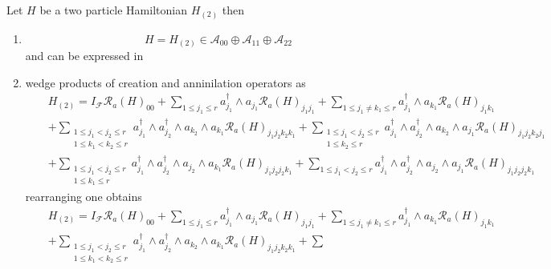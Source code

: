 \documentclass[aps,preprint]{revtex4}
\begin{document}
Let $H$ be a two particle Hamiltonian $H_{\left( 2\right) }$ then

\begin{enumerate}
\item 
\begin{equation}
H=H_{\left( 2\right) }\in \mathcal{A}_{00}\oplus \mathcal{A}_{11}\oplus 
\mathcal{A}_{22}
\end{equation}%
and can be expressed in

\item wedge products of creation and anninilation operators as 
\begin{eqnarray}
&&H_{\left( 2\right) }=I_{\mathcal{F}}\mathcal{R}_{a}\left( H\right)
_{00}+\sum_{1\leq j_{1}\leq r}a_{j_{1}}^{\dagger }\wedge a_{j_{1}}\mathcal{R}%
_{a}\left( H\right) _{j_{1}j_{1}}+\sum_{1\leq j_{1}\neq k_{1}\leq
r}a_{j_{1}}^{\dagger }\wedge a_{k_{1}}\mathcal{R}_{a}\left( H\right)
_{j_{1}k_{1}} \\
&&+\sum_{\substack{ 1\leq j_{1}<j_{2}\leq r \\ 1\leq k_{1}<k_{2}\leq r}}%
a_{j_{1}}^{\dagger }\wedge a_{j_{2}}^{\dagger }\wedge a_{k_{2}}\wedge
a_{k_{1}}\mathcal{R}_{a}\left( H\right) _{j_{1}j_{2}k_{2}k_{1}}+\sum
_{\substack{ 1\leq j_{1}<j_{2}\leq r \\ 1\leq k_{2}\leq r}}%
a_{j_{1}}^{\dagger }\wedge a_{j_{2}}^{\dagger }\wedge a_{k_{2}}\wedge
a_{j_{1}}\mathcal{R}_{a}\left( H\right) _{j_{1}j_{2}k_{2}j_{1}} \\
&&+\sum_{\substack{ 1\leq j_{1}<j_{2}\leq r \\ 1\leq k_{1}\leq r}}%
a_{j_{1}}^{\dagger }\wedge a_{j_{2}}^{\dagger }\wedge a_{j_{2}}\wedge
a_{k_{1}}\mathcal{R}_{a}\left( H\right) _{j_{1}j_{2}j_{2}k_{1}}+\sum_{1\leq
j_{1}<j_{2}\leq r}a_{j_{1}}^{\dagger }\wedge a_{j_{2}}^{\dagger }\wedge
a_{j_{2}}\wedge a_{j_{1}}\mathcal{R}_{a}\left( H\right)
_{j_{1}j_{2}j_{2}k_{1}}
\end{eqnarray}%
rearranging one obtains 
\begin{eqnarray}
&&H_{\left( 2\right) }=I_{\mathcal{F}}\mathcal{R}_{a}\left( H\right)
_{00}+\sum_{1\leq j_{1}\leq r}a_{j_{1}}^{\dagger }\wedge a_{j_{1}}\mathcal{R}%
_{a}\left( H\right) _{j_{1}j_{1}}+\sum_{1\leq j_{1}\neq k_{1}\leq
r}a_{j_{1}}^{\dagger }\wedge a_{k_{1}}\mathcal{R}_{a}\left( H\right)
_{j_{1}k_{1}} \\
&&+\sum_{\substack{ 1\leq j_{1}<j_{2}\leq r \\ 1\leq k_{1}<k_{2}\leq r}}%
a_{j_{1}}^{\dagger }\wedge a_{j_{2}}^{\dagger }\wedge a_{k_{2}}\wedge
a_{k_{1}}\mathcal{R}_{a}\left( H\right) _{j_{1}j_{2}k_{2}k_{1}}+\sum

\end{eqnarray}
\end{enumerate}
\end{document}
